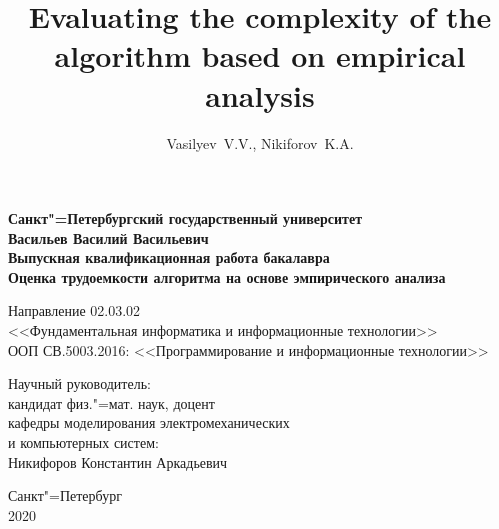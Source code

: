 \documentclass[a4paper, article, 14pt]{extarticle}
\begin{document}

\author{Vasilyev~V.\:V., Nikiforov~K.\:A.}
\title{Evaluating the complexity of the algorithm based on empirical analysis}




\begin{center}
	\textbf{Санкт"=Петербургский государственный университет}\\
	\hfill \break
	\hfill \break
	\hfill \break
	\textbf{Васильев Василий Васильевич}\\
	\hfill \break
	\hfill \break
	\textbf{Выпускная квалификационная работа бакалавра}\\
	\hfill \break
	\Large{\textbf{Оценка трудоемкости алгоритма на основе эмпирического анализа}}\\
\end{center}

\hfill \break

\begin{center}
	Направление 02.03.02\\
	<<Фундаментальная информатика и информационные технологии>>\\
	ООП СВ.5003.2016: <<Программирование и информационные технологии>>\\
\end{center}

\hfill \break

\begin{flushright}
	Научный руководитель:\\
	кандидат физ."=мат. наук, доцент\\
	кафедры моделирования электромеханических\\
	и компьютерных систем:\\
	Никифоров Константин Аркадьевич
\end{flushright}

\hfill \break
\hfill \break
\hfill \break

\begin{center}
	Санкт"=Петербург\\
	2020
\end{center}
\thispagestyle{empty} %

\end{document}
